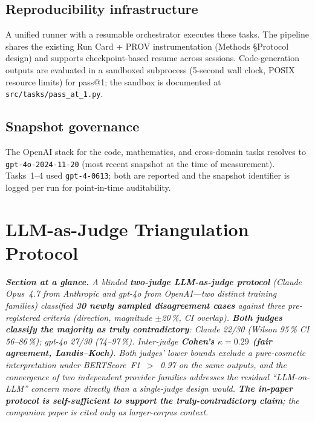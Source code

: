 \documentclass[11pt]{article}
\begin{document}
\subsection{Reproducibility infrastructure}

A unified runner with a resumable orchestrator executes these tasks. The pipeline shares the existing Run Card + PROV instrumentation (Methods §Protocol design) and supports checkpoint-based resume across sessions. Code-generation outputs are evaluated in a sandboxed subprocess (5-second wall clock, POSIX resource limits) for pass@1; the sandbox is documented at \texttt{src/tasks/pass\_at\_1.py}.

\subsection{Snapshot governance}

The OpenAI stack for the code, mathematics, and cross-domain tasks resolves to \texttt{gpt-4o-2024-11-20} (most recent snapshot at the time of measurement). Tasks~1--4 used \texttt{gpt-4-0613}; both are reported and the snapshot identifier is logged per run for point-in-time auditability.


\section{LLM-as-Judge Triangulation Protocol}\label{sec:s12}

\textit{\textbf{Section at a glance.} A blinded \textbf{two-judge LLM-as-judge protocol} (Claude Opus~4.7 from Anthropic and gpt-4o from OpenAI---two distinct training families) classified \textbf{30 newly sampled disagreement cases} against three pre-registered criteria (direction, magnitude $\pm$20\,\%, CI overlap). \textbf{Both judges classify the majority as truly contradictory}: Claude 22/30 (Wilson 95\,\% CI 56--86\,\%); gpt-4o 27/30 (74--97\,\%). Inter-judge \textbf{Cohen's $\kappa = 0.29$ (fair agreement, Landis--Koch)}. Both judges' lower bounds exclude a pure-cosmetic interpretation under BERTScore~F1~$>$~0.97 on the same outputs, and the convergence of two independent provider families addresses the residual ``LLM-on-LLM'' concern more directly than a single-judge design would. \textbf{The in-paper protocol is self-sufficient to support the truly-contradictory claim}; the companion paper is cited only as larger-corpus context.}
\end{document}
